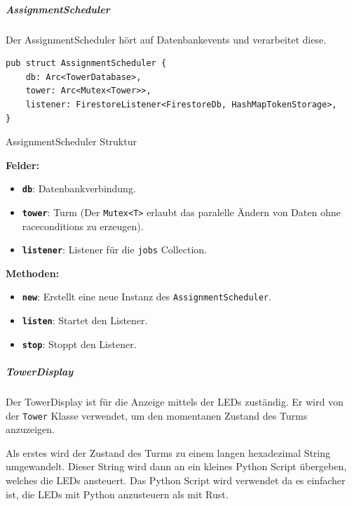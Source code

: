 \subparagraph{AssignmentScheduler}

Der AssignmentScheduler hört auf Datenbankevents und verarbeitet diese.

\begin{listing}[H]
  \begin{verbatim}
pub struct AssignmentScheduler {
    db: Arc<TowerDatabase>,
    tower: Arc<Mutex<Tower>>,
    listener: FirestoreListener<FirestoreDb, HashMapTokenStorage>,
}
\end{verbatim}
  \caption{AssignmentScheduler Struktur}
  \label{lst:assignment_scheduler_struktur}
\end{listing}

\textbf{Felder:}
\begin{itemize}
  \item \textbf{\texttt{db}}: Datenbankverbindung.
  \item \textbf{\texttt{tower}}: Turm (Der \texttt{Mutex<T>} erlaubt das paralelle Ändern von Daten ohne \glspl{racecondition} zu erzeugen).
  \item \textbf{\texttt{listener}}: Listener für die \texttt{jobs} Collection.
\end{itemize}

\textbf{Methoden:}
\begin{itemize}
  \item \textbf{\texttt{new}}: Erstellt eine neue Instanz des \texttt{AssignmentScheduler}.
  \item \textbf{\texttt{listen}}: Startet den Listener.
  \item \textbf{\texttt{stop}}: Stoppt den Listener.
\end{itemize}


\subparagraph{TowerDisplay}

Der TowerDisplay ist für die Anzeige mittels der LEDs zuständig. Er wird von der \texttt{Tower} Klasse verwendet, um den momentanen Zustand des Turms anzuzeigen.

Als erstes wird der Zustand des Turms zu einem langen hexadezimal String umgewandelt. Dieser String wird dann an ein kleines Python Script übergeben, welches die LEDs ansteuert. Das Python Script wird verwendet da es einfacher ist, die LEDs mit Python anzusteuern als mit Rust.